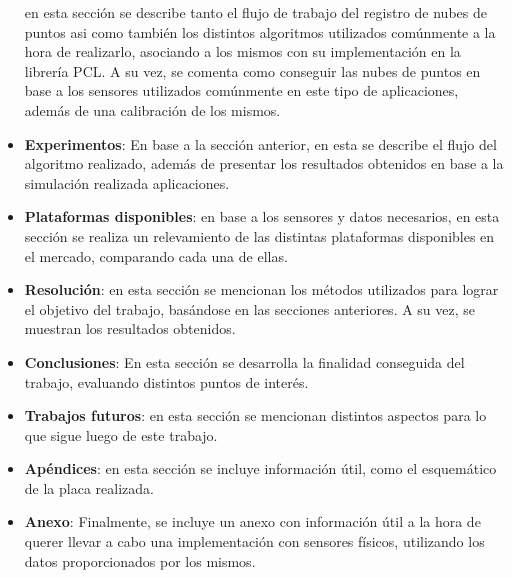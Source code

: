\begin{itemize}
        \fi
    \fi 
    en esta sección se describe tanto el flujo de trabajo del registro de nubes de puntos asi como también los distintos algoritmos utilizados comúnmente a la hora de realizarlo, asociando a los mismos con su implementación en la librería PCL. A su vez, se comenta como conseguir las nubes de puntos en base a los sensores utilizados comúnmente en este tipo de
    \ifimagenes
    aplicaciones, además de una calibración de los mismos.
    \item \textbf{Experimentos}: En base a la sección anterior, en esta se describe el flujo del algoritmo realizado, además de presentar los resultados obtenidos en base a la simulación realizada
    \else
    aplicaciones.
    \item \textbf{Plataformas disponibles}: en base a los sensores y datos necesarios, en esta sección se realiza un relevamiento de las distintas plataformas disponibles en el mercado, comparando cada una de ellas.
    \item \textbf{Resolución}: en esta sección se mencionan los métodos utilizados para lograr el objetivo del trabajo, basándose en las secciones anteriores. A su vez, se muestran los resultados obtenidos.
    \fi
    \item \textbf{Conclusiones}: En esta sección se desarrolla la finalidad conseguida del trabajo, evaluando distintos puntos de interés.
    \ifimagenes
    \item \textbf{Trabajos futuros}: en esta sección se mencionan distintos aspectos para lo que sigue luego de este trabajo.
    \else
    \item \textbf{Apéndices}: en esta sección se incluye información útil, como el esquemático de la placa realizada.
        \ifimagenespaper
        \else
    \item \textbf{Anexo}: Finalmente, se incluye un anexo con información útil a la hora de querer llevar a cabo una implementación con sensores físicos, utilizando los datos proporcionados por los mismos.
        \fi
    \fi
\end{itemize}